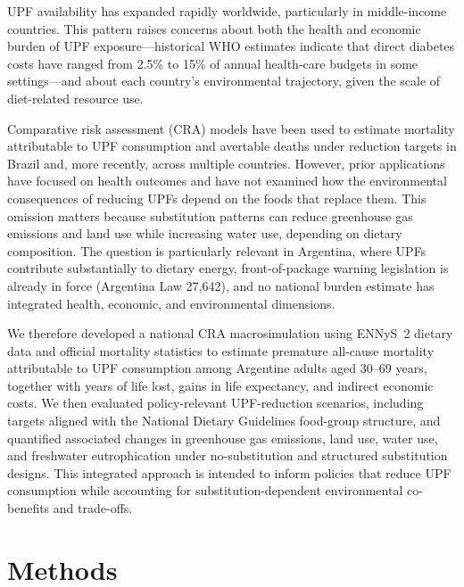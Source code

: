 ﻿\documentclass{article}
\begin{document}
UPF availability has expanded rapidly worldwide, particularly in middle-income countries.\cite{PAHO2015,Cediel2021} This pattern raises concerns about both the health and economic burden of UPF exposure---historical WHO estimates indicate that direct diabetes costs have ranged from 2.5\% to 15\% of annual health-care budgets in some settings\cite{WHO2003DiabetesCosts}---and about each country's environmental trajectory, given the scale of diet-related resource use.

Comparative risk assessment (CRA) models have been used to estimate mortality attributable to UPF consumption and avertable deaths under reduction targets in Brazil\citep{Nilson2023} and, more recently, across multiple countries.\citep{Nilson2025} However, prior applications have focused on health outcomes and have not examined how the environmental consequences of reducing UPFs depend on the foods that replace them. This omission matters because substitution patterns can reduce greenhouse gas emissions and land use while increasing water use, depending on dietary composition.\cite{Anastasiou2022,Garzillo2022RSP,Arrieta2022SustainSci} The question is particularly relevant in Argentina, where UPFs contribute substantially to dietary energy,\citep{Zapata2023} front-of-package warning legislation is already in force (Argentina Law 27,642),\citep{ArgentinaLaw27642} and no national burden estimate has integrated health, economic, and environmental dimensions.

We therefore developed a national CRA macrosimulation using ENNyS~2 dietary data and official mortality statistics to estimate premature all-cause mortality attributable to UPF consumption among Argentine adults aged 30--69 years, together with years of life lost, gains in life expectancy, and indirect economic costs. We then evaluated policy-relevant UPF-reduction scenarios, including targets aligned with the National Dietary Guidelines food-group structure,\citep{NDG2016} and quantified associated changes in greenhouse gas emissions, land use, water use, and freshwater eutrophication under no-substitution and structured substitution designs. This integrated approach is intended to inform policies that reduce UPF consumption while accounting for substitution-dependent environmental co-benefits and trade-offs.

\section{Methods}\label{methods}
\end{document}
